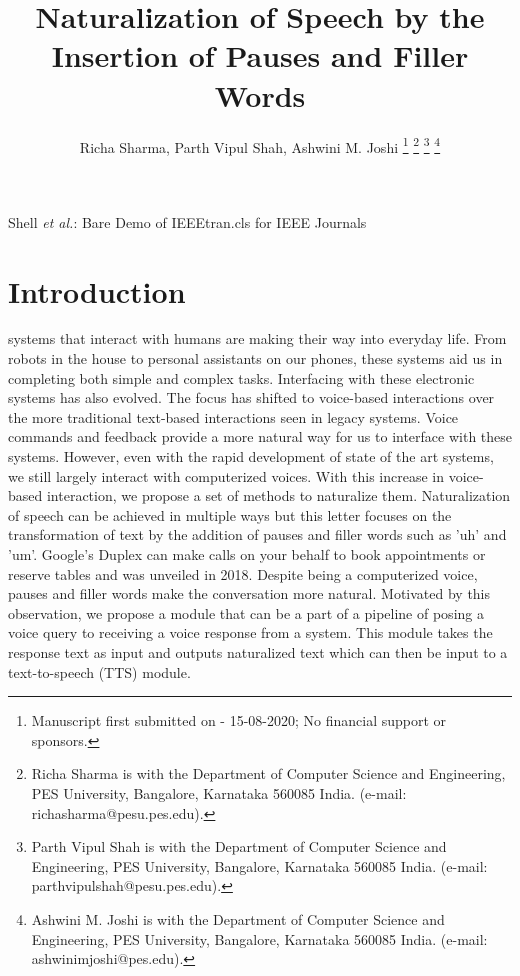 \documentclass[journal]{IEEEtran}
\begin{document}
\title{Naturalization of Speech by the Insertion of Pauses and Filler Words}

\author{Richa Sharma, Parth Vipul Shah, Ashwini M. Joshi 
\thanks{Manuscript first submitted on - 15-08-2020; No financial support or sponsors.}
\thanks{Richa Sharma is with the Department of Computer Science and Engineering, PES University, Bangalore, Karnataka 560085 India. (e-mail: richasharma@pesu.pes.edu).}
\thanks{Parth Vipul Shah is with the Department of Computer Science and Engineering, PES University, Bangalore, Karnataka 560085 India. (e-mail: parthvipulshah@pesu.pes.edu).}
\thanks{Ashwini M. Joshi is with the Department of Computer Science and Engineering, PES University, Bangalore, Karnataka 560085 India. (e-mail: ashwinimjoshi@pes.edu).}
}

{Shell \MakeLowercase{\textit{et al.}}: Bare Demo of IEEEtran.cls for IEEE Journals}
\maketitle

\begin{abstract}

\end{abstract}

\begin{IEEEkeywords}

\end{IEEEkeywords}

\IEEEpeerreviewmaketitle

\section{Introduction}

 systems that interact with humans are making their way into everyday life. From robots in the house to personal assistants on our phones, these systems aid us in completing both simple and complex tasks. Interfacing with these electronic systems has also evolved. The focus has shifted to voice-based interactions over the more traditional text-based interactions seen in legacy systems. Voice commands and feedback provide a more natural way for us to interface with these systems. However, even with the rapid development of state of the art systems, we still largely interact with computerized voices. With this increase in voice-based interaction, we propose a set of methods to naturalize them. Naturalization of speech can be achieved in multiple ways but this letter focuses on the transformation of text by the addition of pauses and filler words such as 'uh' and 'um'. Google's Duplex can make calls on your behalf to book appointments or reserve tables and was unveiled in 2018. Despite being a computerized voice, pauses and filler words make the conversation more natural. Motivated by this observation, we propose a module that can be a part of a pipeline of posing a voice query to receiving a voice response from a system. This module takes the response text as input and outputs naturalized text which can then be input to a text-to-speech (TTS) module. \\
\end{document}
